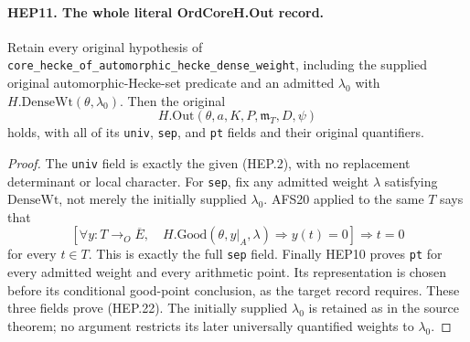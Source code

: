 \documentclass[11pt,a4paper]{article}
\numberwithin{equation}{section}
\theoremstyle{remark}\newtheorem{remark}[theorem]{Remark}
\begin{document}
\paragraph{HEP11. The whole literal OrdCoreH.Out record.}
\label{claim:HEP11}
Retain every original hypothesis of
\texttt{core\_\allowbreak hecke\_\allowbreak of\_\allowbreak automorphic\_\allowbreak hecke\_\allowbreak dense\_\allowbreak weight},
including the supplied original automorphic-Hecke-set predicate
and an admitted $\lambda_0$ with $H.\mathrm{DenseWt}(\theta,\lambda_0)$.
Then the original
\[
           H.\mathrm{Out}(\theta,a,K,P,\mathfrak m_T,D,\psi)
 \tag{HEP.22}
\]
holds, with all of its \texttt{univ}, \texttt{sep}, and \texttt{pt}
fields and their original quantifiers.
\begin{proof}
The \texttt{univ} field is exactly the given (HEP.2), with no
replacement determinant or local character.
For \texttt{sep}, fix any admitted weight $\lambda$ satisfying
$\mathrm{DenseWt}$, not merely the initially supplied $\lambda_0$.
AFS20 applied to the same $T$ says that
\[
 \left[\forall y:T\to_O\overline E,\quad
 H.\mathrm{Good}(\theta,y|_A,\lambda)\Rightarrow y(t)=0\right]
                      \Longrightarrow t=0
 \tag{HEP.23}
\]
for every $t\in T$.  This is exactly the full \texttt{sep} field.
Finally HEP10 proves \texttt{pt} for every admitted weight and
every arithmetic point.  Its representation is chosen before its
conditional good-point conclusion, as the target record requires.
These three fields prove (HEP.22).  The initially supplied
$\lambda_0$ is retained as in the source theorem; no argument
restricts its later universally quantified weights to $\lambda_0$.
\end{proof}

\end{document}
